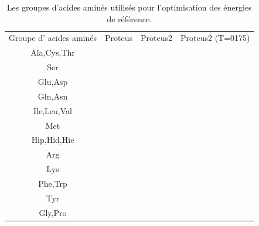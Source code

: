 \begin{table}[!htbp]
      \centering

      \begin{tabular}{cccc}

        \toprule
        Groupe d' acides aminés & Proteus & Proteus2 & Proteus2 (T=0175)\\
        \cmidrule{1-3}

         Ala,Cys,Thr & \\
         Ser         & \\
         Glu,Asp     & \\
         Gln,Asn     & \\
         Ile,Leu,Val & \\
         Met         & \\
         Hip,Hid,Hie & \\
         Arg         & \\
         Lys         & \\
         Phe,Trp     & \\
         Tyr         & \\
         Gly,Pro     & \\
        \bottomrule


      \end{tabular}      
      \caption{Les groupes d'acides aminés utilisés pour l'optimisation des énergies de référence.}
\label{tab:RefEner_groupes}      
    \end{table}



    \clearpage


